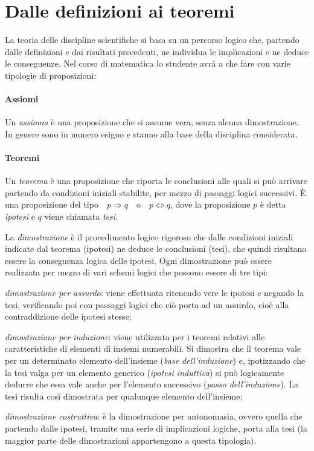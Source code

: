 \section{Dalle definizioni ai teoremi}

La teoria delle discipline scientifiche si basa su un percorso logico che, partendo dalle definizioni e dai risultati precedenti, ne individua le implicazioni e ne deduce le conseguenze. Nel corso di matematica lo studente avrà a che fare con varie tipologie di proposizioni:

\paragraph{Assiomi}
Un \emph{assioma} è una proposizione che si assume vera, senza alcuna dimostrazione. In genere sono in numero esiguo e stanno alla base della disciplina considerata.

\paragraph{Teoremi}
Un \emph{teorema} è una proposizione che riporta le conclusioni alle quali si può arrivare partendo da condizioni iniziali stabilite, per mezzo di passaggi logici successivi. \`E una proposizione del tipo\ \  $p\Rightarrow q$\ \ o\ \ $p \Leftrightarrow q$, dove la proposizione $p$ è detta \emph{ipotesi} e $q$ viene chiamata \emph{tesi}.

La \emph{dimostrazione} è il procedimento logico rigoroso che dalle condizioni iniziali indicate dal teorema (ipotesi) ne deduce le conclusioni (tesi), che quindi risultano essere la conseguenza logica delle ipotesi.
Ogni dimostrazione può essere realizzata per mezzo di vari schemi logici che possono essere di tre tipi:

\begin{itemize*}
\item \emph{dimostrazione per assurdo}: viene effettuata ritenendo vere le ipotesi e negando la tesi, verificando poi con passaggi logici che ciò porta ad un assurdo, cioè alla contraddizione delle ipotesi stesse;
\item \emph{dimostrazione per induzione}: viene utilizzata per i teoremi relativi alle caratteristiche di elementi di insiemi numerabili. Si dimostra che il teorema vale per un determinato elemento dell'insieme (\emph{base dell'induzione}) e, ipotizzando che la tesi valga per un elemento generico (\emph{ipotesi induttiva}) si può logicamente dedurre che essa vale anche per l'elemento successivo (\emph{passo dell'induzione}). La tesi risulta così dimostrata per qualunque elemento dell'insieme;
\item \emph{dimostrazione costruttiva}: è la dimostrazione per antonomasia, ovvero quella che partendo dalle ipotesi, tramite una serie di implicazioni logiche, porta alla tesi (la maggior parte delle dimostrazioni appartengono a questa tipologia).
\end{itemize*}

